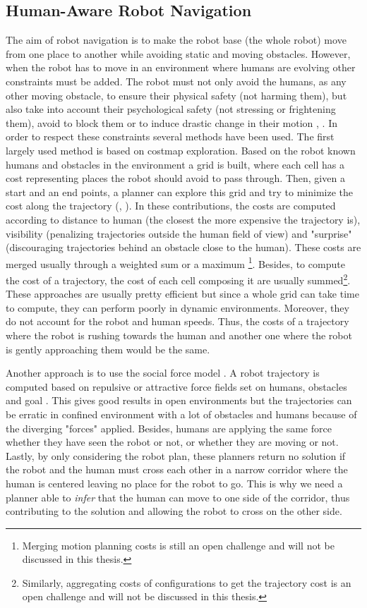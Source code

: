 \documentclass[a4paper,11pt,twoside]{StyleThese}
\begin{document}
\subsection{Human-Aware Robot Navigation}
The aim of robot navigation is to make the robot base (the whole robot) move from one place to another while avoiding static and moving obstacles. However, when the robot has to move in an environment where humans are evolving other constraints must be added. The robot must not only avoid the humans, as any other moving obstacle, to ensure their physical safety (not harming them), but also take into account their psychological safety (not stressing or frightening them), avoid to block them or to induce drastic change in their motion \cite{sisbot_human_2007}, \cite{kruse_human-aware_2013}. In order to respect these constraints several methods have been used. The first largely used method is based on costmap exploration. Based on the robot known humans and obstacles in the environment a grid is built, where each cell has a cost representing places the robot should avoid to pass through. Then, given a start and an end points, a planner can explore this grid and try to minimize the cost along the trajectory (\cite{sisbot_human_2007}, \cite{lu_towards_2013}). In these contributions, the costs are computed according to distance to human (the closest the more expensive the trajectory is), visibility (penalizing trajectories outside the human field of view) and "surprise" (discouraging trajectories behind an obstacle close to the human). These costs are merged usually through a weighted sum or a maximum \footnote{Merging motion planning costs is still an open challenge and will not be discussed in this thesis.}. Besides, to compute the cost of a trajectory, the cost of each cell composing it are usually summed\footnote{Similarly, aggregating costs of configurations to get the trajectory cost is an open challenge and will not be discussed in this thesis.}. These approaches are usually pretty efficient but since a whole grid can take time to compute, they can perform poorly in dynamic environments. Moreover, they do not account for the robot and human speeds. Thus, the costs of a trajectory where the robot is rushing towards the human and another one where the robot is gently approaching them would be the same.

Another approach is to use the social force model \cite{helbing_social_1995}. A robot trajectory is computed based on repulsive or attractive force fields set on humans, obstacles and goal \cite{ferrer_robot_2013}. This gives good results in open environments but the trajectories can be erratic in confined environment with a lot of obstacles and humans because of the diverging "forces" applied. Besides, humans are applying the same force whether they have seen the robot or not, or whether they are moving or not. Lastly, by only considering the robot plan, these planners return no solution if the robot and the human must cross each other in a narrow corridor where the human is centered leaving no place for the robot to go. This is why we need a planner able to \textit{infer} that the human can move to one side of the corridor, thus contributing to the solution and allowing the robot to cross on the other side.
\end{document}
